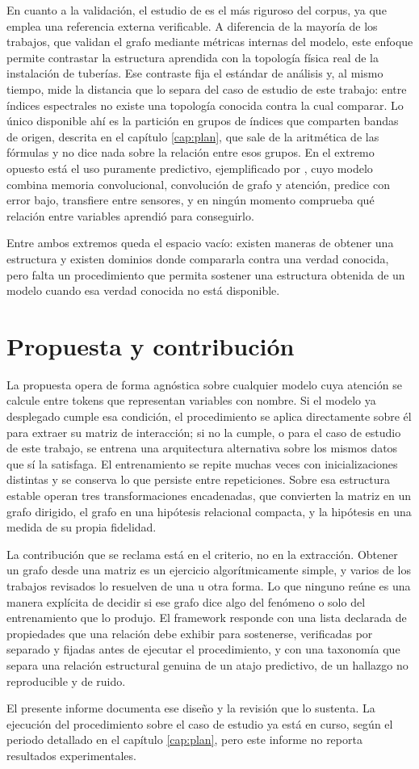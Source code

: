 En cuanto a la validación, el estudio de \textcite{pipeline2026causalgraph} es el más riguroso del corpus, ya que emplea una referencia externa verificable. A diferencia de la mayoría de los trabajos, que validan el grafo mediante métricas internas del modelo, este enfoque permite contrastar la estructura aprendida con la topología física real de la instalación de tuberías. Ese contraste fija el estándar de análisis y, al mismo tiempo, mide la distancia que lo separa del caso de estudio de este trabajo: entre índices espectrales no existe una topología conocida contra la cual comparar. Lo único disponible ahí es la partición en grupos de índices que comparten bandas de origen, descrita en el capítulo \ref{cap:plan}, que sale de la aritmética de las fórmulas y no dice nada sobre la relación entre esos grupos. En el extremo opuesto está el uso puramente predictivo, ejemplificado por \textcite{convlstmgcn2026vegetation}, cuyo modelo combina memoria convolucional, convolución de grafo y atención, predice con error bajo, transfiere entre sensores, y en ningún momento comprueba qué relación entre variables aprendió para conseguirlo.

Entre ambos extremos queda el espacio vacío: existen maneras de obtener una estructura y existen dominios donde compararla contra una verdad conocida, pero falta un procedimiento que permita sostener una estructura obtenida de un modelo cuando esa verdad conocida no está disponible.

\section{Propuesta y contribución}

La propuesta opera de forma agnóstica sobre cualquier modelo cuya atención se calcule entre tokens que representan variables con nombre. Si el modelo ya desplegado cumple esa condición, el procedimiento se aplica directamente sobre él para extraer su matriz de interacción; si no la cumple, o para el caso de estudio de este trabajo, se entrena una arquitectura alternativa sobre los mismos datos que sí la satisfaga. El entrenamiento se repite muchas veces con inicializaciones distintas y se conserva lo que persiste entre repeticiones. Sobre esa estructura estable operan tres transformaciones encadenadas, que convierten la matriz en un grafo dirigido, el grafo en una hipótesis relacional compacta, y la hipótesis en una medida de su propia fidelidad.

La contribución que se reclama está en el criterio, no en la extracción. Obtener un grafo desde una matriz es un ejercicio algorítmicamente simple, y varios de los trabajos revisados lo resuelven de una u otra forma. Lo que ninguno reúne es una manera explícita de decidir si ese grafo dice algo del fenómeno o solo del entrenamiento que lo produjo. El framework responde con una lista declarada de propiedades que una relación debe exhibir para sostenerse, verificadas por separado y fijadas antes de ejecutar el procedimiento, y con una taxonomía que separa una relación estructural genuina de un atajo predictivo, de un hallazgo no reproducible y de ruido.

El presente informe documenta ese diseño y la revisión que lo sustenta. La ejecución del procedimiento sobre el caso de estudio ya está en curso, según el periodo detallado en el capítulo \ref{cap:plan}, pero este informe no reporta resultados experimentales.
